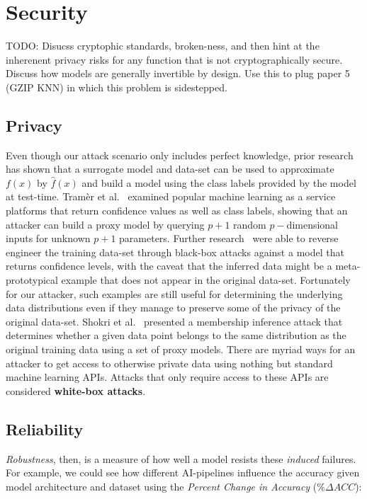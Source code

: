 \section{Security}
TODO: Disucss cryptophic standards, broken-ness, and then hint at the inherenent privacy risks for any function that is not cryptographically secure. Discuss how models are generally invertible by design. Use this to plug paper 5 (GZIP KNN) in which this problem is sidestepped.



\subsection{Privacy }
\label{privacy}
Even though our attack scenario only includes perfect knowledge, prior research~\cite{fredrikson2015model, biggio2013evasion, chakraborty2018adversarial, wang2019security, ateniese2015hacking} has shown that a surrogate model and data-set can be used to approximate $f(x)$ by $\hat{f}(x)$ and build a model using the class labels provided by the model at test-time. Tram\`er et al.~\cite{tramer2016stealing} examined popular machine learning as a service platforms that return confidence values as well as class labels, showing that an attacker can build a proxy model by querying $ p + 1$ random $p-$dimensional inputs for unknown $p+1$ parameters. Further research~\cite{fredrikson2015model} were able to reverse engineer the training data-set through black-box attacks against a model that returns confidence levels, with the caveat that the inferred data might be a meta-prototypical example that does not appear in the original data-set. Fortunately for our attacker, such examples are still useful for determining the underlying data distributions even if they manage to preserve some of the privacy of the original data-set. Shokri et al.~\cite{shokri2017membership} presented a membership inference attack that determines whether a given data point belongs to the same distribution as the original training data using a set of proxy models. There are myriad ways for an attacker to get access to otherwise private data using nothing but standard machine learning APIs. Attacks that only require access to these APIs are considered \textbf{white-box attacks}.




\subsection{Reliability}
\label{reliability}
\textit{Robustness}, then, is a measure of how well a model resists these \textit{induced} failures. For example, we could see how different AI-pipelines influence the accuracy given model architecture and dataset using the \textit{Percent Change in Accuracy} ($\%\Delta ACC$):

